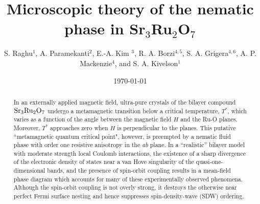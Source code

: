 \documentclass[prb,aps,amssymb,showpacs,twocolumn,amsmath,floatfix]{revtex4}
\def\SRO{Sr$_3$Ru$_2$O$_7$}
\begin{document}
\title{Microscopic theory of the nematic phase in \SRO}
\author{S. Raghu$^1$, A. Paramekanti$^2$, E.-A. Kim $^3$, R. A. Borzi$^{4,5}$, S. A. Grigera$^{4,6}$, A. P. Mackenzie$^4$, and S. A. Kivelson$^1$}
\date{\today}


\begin{abstract}
In an externally applied
magnetic field, ultra-pure crystals of the  
bilayer 
 compound ${\rm Sr}_3{\rm Ru}_2{\rm O}_7$ undergo a metamagnetic
transition below a critical temperature, $T^*$, which 
varies as a function of the angle between the magnetic field $H$ and the Ru-O planes.  Moreover,
$T^*$
approaches zero when $H$ is perpendicular to the planes. This putative ``metamagnetic quantum critical
point", however, is preempted by a nematic fluid phase with order one resistive
anisotropy in the {\it ab} plane.  
In a ``realistic'' bilayer model   
with moderate strength local
Coulomb interactions,  
the existence of a sharp divergence of the
electronic density of states near a van Hove singularity of the quasi-one-dimensional bands, and 
the presence of spin-orbit coupling
results in a mean-field
phase diagram which accounts for many of 
these experimentally observed
phenomena.  Although the spin-orbit coupling is not overly strong, it destroys
the otherwise near perfect Fermi surface nesting 
and hence suppresses spin-density-wave (SDW) ordering.


\end{abstract}


\maketitle
\end{document}
